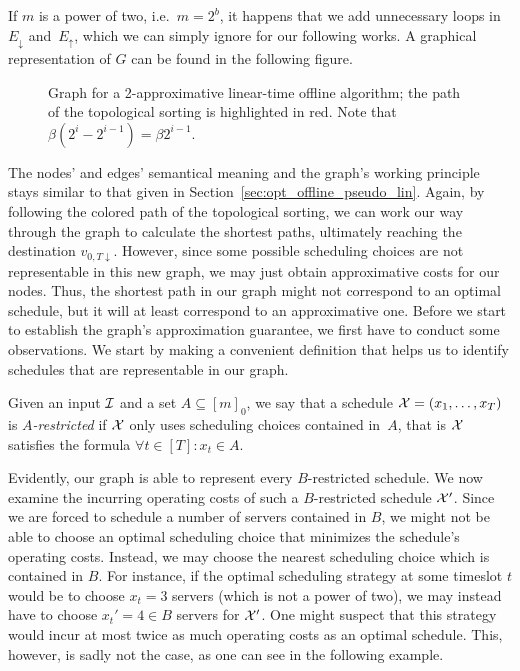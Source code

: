 If $m$ is a power of two, i.e.\ $m=2^b$, it happens that we add unnecessary loops in~$E_\downarrow$ and~$E_\uparrow$, which we can simply ignore for our following works.
A graphical representation of $G$ can be found in the following figure.
\begin{figure}[H]

\caption{Graph for a 2-approximative linear-time offline algorithm; the path of the topological sorting is highlighted in red. Note that $\beta(2^i-2^{i-1})=\beta2^{i-1}$.}
\label{fig:graph_lin_approx_2}
\end{figure}
The nodes' and edges' semantical meaning and the graph's working principle stays similar to that given in Section~\ref{sec:opt_offline_pseudo_lin}. Again, by following the colored path of the topological sorting, we can work our way through the graph to calculate the shortest paths, ultimately reaching the destination $v_{0,T\downarrow}$. However, since some possible scheduling choices are not representable in this new graph, we may just obtain approximative costs for our nodes. Thus, the shortest path in our graph might not correspond to an optimal schedule, but it will at least correspond to an approximative one. Before we start to establish the graph's approximation guarantee, we first have to conduct some observations. We start by making a convenient definition that helps us to identify schedules that are representable in our graph.
\begin{defn}
Given an input $\mathcal{I}$ and a set $A\subseteq[m]_0$, we say that a schedule $\mathcal{X}=(x_1,\dotsc,x_T)$ is \emph{$A$-restricted} if $\mathcal{X}$ only uses scheduling choices contained in~$A$, that is $\mathcal{X}$ satisfies the formula $\forall t\in[T]:x_t\in A$.
\end{defn}
Evidently, our graph is able to represent every $B$-restricted schedule. We now examine the incurring operating costs of such a $B$-restricted schedule $\mathcal{X}'$. Since we are forced to schedule a number of servers contained in $B$, we might not be able to choose an optimal scheduling choice that minimizes the schedule's operating costs. Instead, we may choose the nearest scheduling choice which is contained in $B$. For instance, if the optimal scheduling strategy at some timeslot $t$ would be to choose $x_t=3$ servers (which is not a power of two), we may instead have to choose $x_t'=4\in B$ servers for $\mathcal{X}'$. One might suspect that this strategy would incur at most twice as much operating costs as an optimal schedule. This, however, is sadly not the case, as one can see in the following example.

